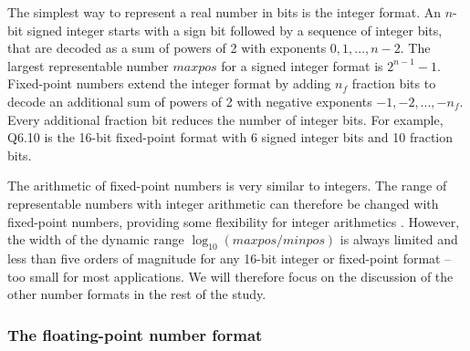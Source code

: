 \documentclass[draft]{agujournal2019}
\begin{document}
The simplest way to represent a real number in bits is the integer format.
An $n$-bit signed integer starts with a sign bit followed by a sequence of integer
bits, that are decoded as a sum of powers of 2 with exponents $0,1,...,n-2$.
The largest representable number $maxpos$ for a signed integer format is $2^{n-1}-1$.
Fixed-point numbers extend the integer format by adding $n_f$ fraction bits to
decode an additional sum of powers of 2 with negative exponents $-1,-2,...,-n_f$.
Every additional fraction bit reduces the number of integer bits. For example,
Q6.10 is the 16-bit fixed-point format with 6 signed integer bits and 10 fraction bits.

The arithmetic of fixed-point numbers is very similar to integers. The range of 
representable numbers with integer arithmetic can therefore be
changed with fixed-point numbers, providing some flexibility for integer arithmetics
\cite{Russell2017}. However, the width of the dynamic range $\log_{10}(maxpos/minpos)$
is always limited and less than five orders of magnitude for any 16-bit integer
or fixed-point format -- too small for most applications. We will therefore focus
on the discussion of the other number formats in the rest of the study.

\subsubsection{The floating-point number format}
\label{sec:floats}
\end{document}
